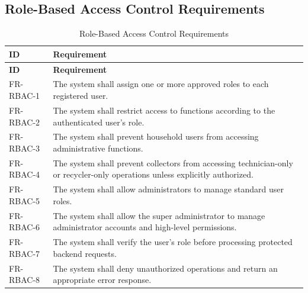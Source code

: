 \subsection{Role-Based Access Control Requirements}
\begin{longtable}{@{}p{2.4cm}p{11cm}@{}}
\caption{Role-Based Access Control Requirements} \label{tab:fr-rbac} \\
\toprule \textbf{ID} & \textbf{Requirement} \\ \midrule
\endfirsthead
\toprule \textbf{ID} & \textbf{Requirement} \\ \midrule
\endhead
FR-RBAC-1 & The system shall assign one or more approved roles to each registered user. \\
FR-RBAC-2 & The system shall restrict access to functions according to the authenticated user's role. \\
FR-RBAC-3 & The system shall prevent household users from accessing administrative functions. \\
FR-RBAC-4 & The system shall prevent collectors from accessing technician-only or recycler-only operations unless explicitly authorized. \\
FR-RBAC-5 & The system shall allow administrators to manage standard user roles. \\
FR-RBAC-6 & The system shall allow the super administrator to manage administrator accounts and high-level permissions. \\
FR-RBAC-7 & The system shall verify the user's role before processing protected backend requests. \\
FR-RBAC-8 & The system shall deny unauthorized operations and return an appropriate error response. \\
\bottomrule
\end{longtable}


